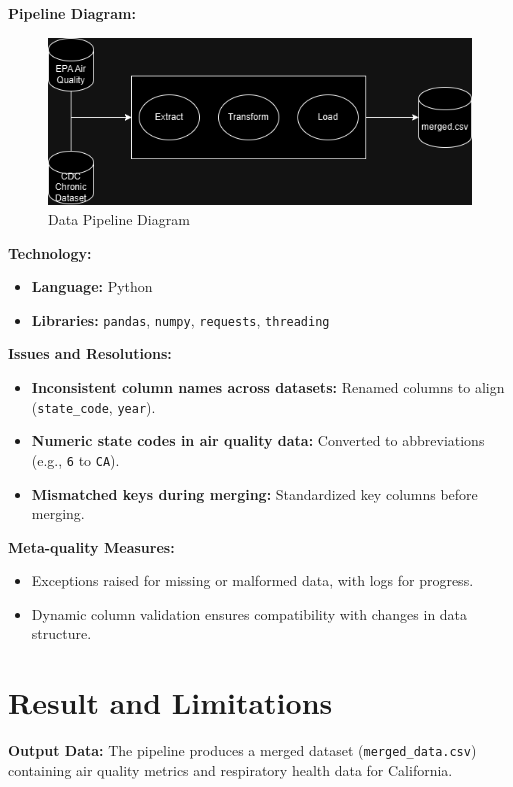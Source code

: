 \documentclass[a4paper,12pt]{article}
\begin{document}
\textbf{Pipeline Diagram:}
\begin{figure}[h!]
    \centering
    \includegraphics[width=\textwidth]{pipeline.png}
    \caption{Data Pipeline Diagram}
    \label{fig:pipeline}
\end{figure}

\textbf{Technology:}
\begin{itemize}
    \item \textbf{Language:} Python
    \item \textbf{Libraries:} \texttt{pandas}, \texttt{numpy}, \texttt{requests}, \texttt{threading}
\end{itemize}

\textbf{Issues and Resolutions:}
\begin{itemize}
    \item \textbf{Inconsistent column names across datasets:} Renamed columns to align (\texttt{state\_code}, \texttt{year}).
    \item \textbf{Numeric state codes in air quality data:} Converted to abbreviations (e.g., \texttt{6} to \texttt{CA}).
    \item \textbf{Mismatched keys during merging:} Standardized key columns before merging.
\end{itemize}

\textbf{Meta-quality Measures:}
\begin{itemize}
    \item Exceptions raised for missing or malformed data, with logs for progress.
    \item Dynamic column validation ensures compatibility with changes in data structure.
\end{itemize}

\section*{Result and Limitations}

\textbf{Output Data:}  
The pipeline produces a merged dataset (\texttt{merged\_data.csv}) containing air quality metrics and respiratory health data for California.  
\end{document}
